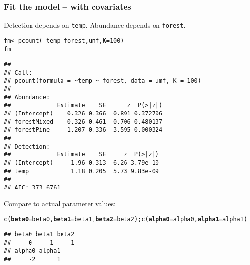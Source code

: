 \documentclass[color=usenames,dvipsnames]{beamer}\usepackage[]{graphicx}\usepackage[]{color}
\makeatletter
\newcommand{\hlnum}[1]{\textcolor[rgb]{0.69,0.494,0}{#1}}%
\newcommand{\hlopt}[1]{\textcolor[rgb]{0,0,0}{#1}}%
\newcommand{\hlstd}[1]{\textcolor[rgb]{0,0,0}{#1}}%
\newcommand{\hlkwb}[1]{\textcolor[rgb]{0,0.341,0.682}{#1}}%
\newcommand{\hlkwc}[1]{\textcolor[rgb]{0,0,0}{\textbf{#1}}}%
\newcommand{\hlkwd}[1]{\textcolor[rgb]{0.004,0.004,0.506}{#1}}%
\newenvironment{kframe}{%
 \def\at@end@of@kframe{}%
 \ifinner\ifhmode%
  \def\at@end@of@kframe{\end{minipage}}%
  \begin{minipage}{\columnwidth}%
 \fi\fi%
 \def\FrameCommand##1{\hskip\@totalleftmargin \hskip-\fboxsep
 \colorbox{shadecolor}{##1}\hskip-\fboxsep
     \hskip-\linewidth \hskip-\@totalleftmargin \hskip\columnwidth}%
 \MakeFramed {\advance\hsize-\width
   \@totalleftmargin\z@ \linewidth\hsize
   \@setminipage}}%
 {\par\unskip\endMakeFramed%
 \at@end@of@kframe}
\newenvironment{knitrout}{}{} %
\makeatother
\begin{document}
\begin{frame}[fragile]
  \frametitle{Fit the model -- with covariates}
  \footnotesize
  Detection depends on {\tt temp}. Abundance depends on {\tt forest}.
\begin{knitrout}\tiny
{}\color{fgcolor}\begin{kframe}
\begin{alltt}
\hlstd{fm} \hlkwb{<-} \hlkwd{pcount}\hlstd{(}\hlopt{~}\hlstd{temp} \hlopt{~}\hlstd{forest, umf,} \hlkwc{K}\hlstd{=}\hlnum{100}\hlstd{)}
\hlstd{fm}
\end{alltt}
\begin{verbatim}
## 
## Call:
## pcount(formula = ~temp ~ forest, data = umf, K = 100)
## 
## Abundance:
##             Estimate    SE      z  P(>|z|)
## (Intercept)   -0.326 0.366 -0.891 0.372706
## forestMixed   -0.326 0.461 -0.706 0.480137
## forestPine     1.207 0.336  3.595 0.000324
## 
## Detection:
##             Estimate    SE     z  P(>|z|)
## (Intercept)    -1.96 0.313 -6.26 3.79e-10
## temp            1.18 0.205  5.73 9.83e-09
## 
## AIC: 373.6761
\end{verbatim}
\end{kframe}
\end{knitrout}
\pause
\vfill
Compare to actual parameter values:
\begin{knitrout}\tiny
{}\color{fgcolor}\begin{kframe}
\begin{alltt}
\hlkwd{c}\hlstd{(}\hlkwc{beta0}\hlstd{=beta0,} \hlkwc{beta1}\hlstd{=beta1,} \hlkwc{beta2}\hlstd{=beta2);} \hlkwd{c}\hlstd{(}\hlkwc{alpha0}\hlstd{=alpha0,} \hlkwc{alpha1}\hlstd{=alpha1)}
\end{alltt}
\begin{verbatim}
## beta0 beta1 beta2 
##     0    -1     1
## alpha0 alpha1 
##     -2      1
\end{verbatim}
\end{kframe}
\end{knitrout}
\end{frame}
\end{document}
